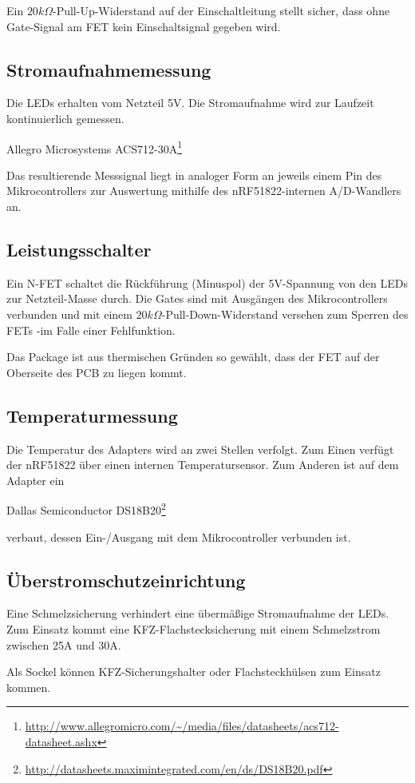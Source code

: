 Ein $20k\Omega$-Pull-Up-Widerstand auf der Einschaltleitung
stellt sicher, dass ohne Gate-Signal am FET
kein Einschaltsignal gegeben wird.

\subsection{Stromaufnahmemessung}
\label{Stromaufnahmemessung}
Die LEDs erhalten vom Netzteil 5V.
Die Stromaufnahme
wird zur Laufzeit kontinuierlich
gemessen.

\begin{center}
Allegro Microsystems ACS712-30A\footnote{\url{http://www.allegromicro.com/~/media/files/datasheets/acs712-datasheet.ashx}}
\end{center}
Das resultierende Messsignal liegt
in analoger Form
an jeweils einem Pin des Mikrocontrollers
zur Auswertung
mithilfe des nRF51822-internen A/D-Wandlers
an.

\subsection{Leistungsschalter}
Ein N-FET schaltet die R\"uckf\"uhrung (Minuspol)
der 5V-Spannung
von den LEDs
zur Netzteil-Masse durch.
Die Gates sind mit Ausg\"angen des Mikrocontrollers verbunden
und mit einem $20k\Omega$-Pull-Down-Widerstand versehen
zum Sperren des FETs
-im Falle einer Fehlfunktion.

Das Package ist
aus thermischen Gr\"unden
so gew\"ahlt,
dass der FET auf der Oberseite des PCB
zu liegen kommt.

\subsection{Temperaturmessung}
Die Temperatur des Adapters wird an zwei Stellen verfolgt.
Zum Einen verf\"ugt der nRF51822 \"uber einen internen Temperatursensor.
Zum Anderen ist auf dem Adapter ein
\begin{center}
	Dallas Semiconductor DS18B20\footnote{\url{http://datasheets.maximintegrated.com/en/ds/DS18B20.pdf}}
\end{center}
verbaut,
dessen Ein-/Ausgang
mit dem Mikrocontroller verbunden ist.

\subsection{\"Uberstromschutzeinrichtung}
Eine Schmelzsicherung verhindert
eine \"uberm\"a{\ss}ige Stromaufnahme
der LEDs.
Zum Einsatz kommt eine KFZ-Flachstecksicherung
mit einem Schmelzstrom zwischen 25A und 30A.

Als Sockel k\"onnen KFZ-Sicherungshalter oder Flachsteckh\"ulsen zum Einsatz kommen.
